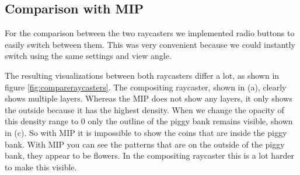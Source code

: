 \subsection{Comparison with MIP}
For the comparison between the two raycasters we implemented radio buttons to easily switch between them.
This was very convenient because we could instantly switch using the same settings and view angle.

The resulting visualizations between both raycasters differ a lot, as shown in figure \ref{fig:compareraycasters}.
The compositing raycaster, shown in (a), clearly shows multiple layers.
Whereas the MIP does not show any layers, it only shows the outside because it has the highest density.
When we change the opacity of this density range to 0 only the outline of the piggy bank remains visible, shown in (c).
So with MIP it is impossible to show the coins that are inside the piggy bank.
With MIP you can see the patterns that are on the outside of the piggy bank, they appear to be flowers.
In the compositing raycaster this is a lot harder to make this visible.

